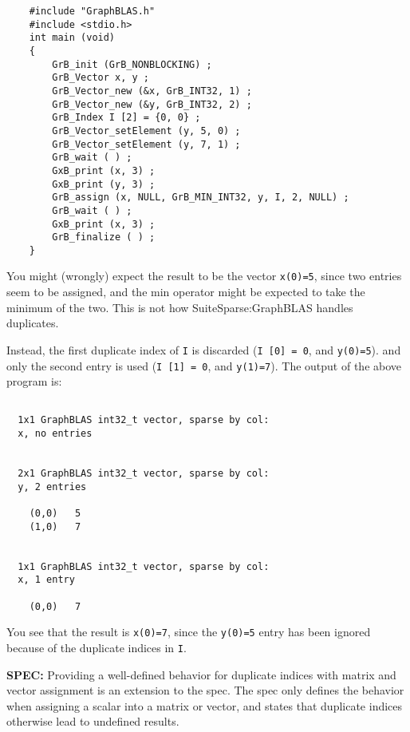 \documentclass[12pt]{article}
\begin{document}
{\small
\begin{verbatim}
    #include "GraphBLAS.h"
    #include <stdio.h>
    int main (void)
    {
        GrB_init (GrB_NONBLOCKING) ;
        GrB_Vector x, y ;
        GrB_Vector_new (&x, GrB_INT32, 1) ;
        GrB_Vector_new (&y, GrB_INT32, 2) ;
        GrB_Index I [2] = {0, 0} ;
        GrB_Vector_setElement (y, 5, 0) ;
        GrB_Vector_setElement (y, 7, 1) ;
        GrB_wait ( ) ;
        GxB_print (x, 3) ;
        GxB_print (y, 3) ;
        GrB_assign (x, NULL, GrB_MIN_INT32, y, I, 2, NULL) ;
        GrB_wait ( ) ;
        GxB_print (x, 3) ;
        GrB_finalize ( ) ;
    }
\end{verbatim}}

You might (wrongly) expect the result to be the vector \verb'x(0)=5', since
two entries seem to be assigned, and the min operator might be expected to
take the minimum of the two.  This is not how SuiteSparse:GraphBLAS handles
duplicates.

Instead, the first duplicate index of \verb'I' is discarded
(\verb'I [0] = 0', and \verb'y(0)=5').
and only the second entry is used
(\verb'I [1] = 0', and \verb'y(1)=7').
The output of the above program is:

{\small
\begin{verbatim}

  1x1 GraphBLAS int32_t vector, sparse by col:
  x, no entries


  2x1 GraphBLAS int32_t vector, sparse by col:
  y, 2 entries

    (0,0)   5
    (1,0)   7


  1x1 GraphBLAS int32_t vector, sparse by col:
  x, 1 entry

    (0,0)   7

\end{verbatim}}

You see that the result is \verb'x(0)=7', since the \verb'y(0)=5' entry
has been ignored because of the duplicate indices in \verb'I'.

\begin{spec}
{\bf SPEC:} Providing a well-defined behavior for duplicate
indices with matrix and vector assignment is an extension to the spec.
The spec only defines the behavior when assigning a scalar into a matrix
or vector, and states that duplicate indices otherwise lead to undefined
results.
\end{spec}



\newpage
\end{document}
